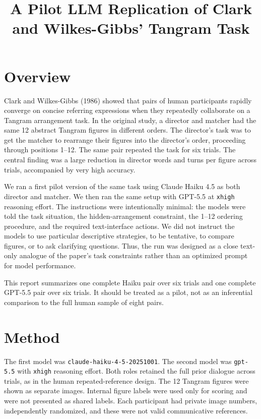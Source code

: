 \documentclass[11pt]{article}
\title{A Pilot LLM Replication of Clark and Wilkes-Gibbs' Tangram Task}
\author{}
\date{}
\begin{document}
\maketitle

\section*{Overview}

Clark and Wilkes-Gibbs (1986) showed that pairs of human participants rapidly converge on concise referring expressions when they repeatedly collaborate on a Tangram arrangement task. In the original study, a director and matcher had the same 12 abstract Tangram figures in different orders. The director's task was to get the matcher to rearrange their figures into the director's order, proceeding through positions 1--12. The same pair repeated the task for six trials. The central finding was a large reduction in director words and turns per figure across trials, accompanied by very high accuracy.

We ran a first pilot version of the same task using Claude Haiku 4.5 as both director and matcher. We then ran the same setup with GPT-5.5 at \texttt{xhigh} reasoning effort. The instructions were intentionally minimal: the models were told the task situation, the hidden-arrangement constraint, the 1--12 ordering procedure, and the required text-interface actions. We did not instruct the models to use particular descriptive strategies, to be tentative, to compare figures, or to ask clarifying questions. Thus, the run was designed as a close text-only analogue of the paper's task constraints rather than an optimized prompt for model performance.

This report summarizes one complete Haiku pair over six trials and one complete GPT-5.5 pair over six trials. It should be treated as a pilot, not as an inferential comparison to the full human sample of eight pairs.

\section*{Method}

The first model was \texttt{claude-haiku-4-5-20251001}. The second model was \texttt{gpt-5.5} with \texttt{xhigh} reasoning effort. Both roles retained the full prior dialogue across trials, as in the human repeated-reference design. The 12 Tangram figures were shown as separate images. Internal figure labels were used only for scoring and were not presented as shared labels. Each participant had private image numbers, independently randomized, and these were not valid communicative references.
\end{document}
